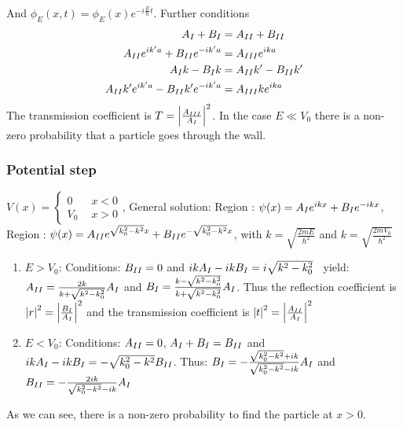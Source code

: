 And $\phi_E(x,t) = \phi_E(x) e^{-i \frac{E}{\hbar} t}$.
Further conditions
\begin{align*}
    A_{\uproman{1}} + B_{\uproman{1}} &= A_{\uproman{2}} + B_{\uproman{2}}
    \\
    A_{\uproman{2}} e^{i k' a} + B_{\uproman{2}} e^{-i k' a} &= A_{\uproman{3}} e^{i k a}
    \\
    A_{\uproman{1}} k - B_{\uproman{1}} k &= A_{\uproman{2}} k' - B_{\uproman{2}} k'
    \\
    A_{\uproman{2}} k' e^{i k' a} - B_{\uproman{2}} k' e^{-i k' a} &= A_{\uproman{3}} k e^{i k a}
\end{align*}
The transmission coefficient is $T = \abs{\frac{A_{\uproman{3}}}{A_{\uproman{1}}}}^2$.
In the case $E \ll V_0$ there is a non-zero probability that a particle goes through
the wall.

\subsubsection{Potential step}
$V(x) = \begin{cases}
    0 \hspace{5pt} &x<0
    \\
    V_0 \hspace{5pt} &x>0
\end{cases}$,
General solution:
Region : $\psi(x) = A_{\uproman{1}} e^{i k x} + B_{\uproman{1}} e^{-i k x}$,
Region : $\psi(x) = A_{\uproman{2}} e^{\sqrt{k_0^2 - k^2} x} + B_{\uproman{2}} e^{- \sqrt{k_0^2 - k^2} x}$,
with $k = \sqrt{\frac{2 m E}{\hbar^2}}$ and $k = \sqrt{\frac{2 m V_0}{\hbar^2}}$
\begin{enumerate}
    \item \underline{$E>V_0$}:
        Conditions: $B_{\uproman{2}} = 0$ and $i k A_{\uproman{1}} - i k B_{\uproman{1}} = i \sqrt{k^2 - k_0^2}$
        \ yield: $A_{\uproman{2}} = \frac{2 k}{k + \sqrt{k^2 - k_0^2}} A_{\uproman{1}}$ and
        $B_{\uproman{1}} = \frac{k - \sqrt{k^2 - k_0^2}}{k + \sqrt{k^2 - k_0^2}} A_{\uproman{1}}$.
        Thus the reflection coefficient is $\abs{r}^2 = \abs{\frac{B_{\uproman{1}}}{A_{\uproman{1}}}}^2$
        and the transmission coefficient is $\abs{t}^2 = \abs{\frac{A_{\uproman{2}}}{A_{\uproman{1}}}}^2$
    \item \underline{$E<V_0$}:
        Conditions: $A_{\uproman{2}} = 0$, $A_{\uproman{1}} + B_{\uproman{1}} = B_{\uproman{2}}$
        and $i k A_{\uproman{1}} - i k B_{\uproman{1}} = - \sqrt{k_0^2 - k^2} B_{\uproman{2}}$.
        Thus: $B_{\uproman{1}} = - \frac{\sqrt{k_0^2 - k^2} + i k}{\sqrt{k_0^2 - k^2} - i k} A_{\uproman{1}}$
        and $B_{\uproman{2}} = - \frac{2 i k}{\sqrt{k_0^2 - k^2} - i k} A_{\uproman{1}}$
\end{enumerate}
As we can see, there is a non-zero probability to find the particle at $x>0$.

